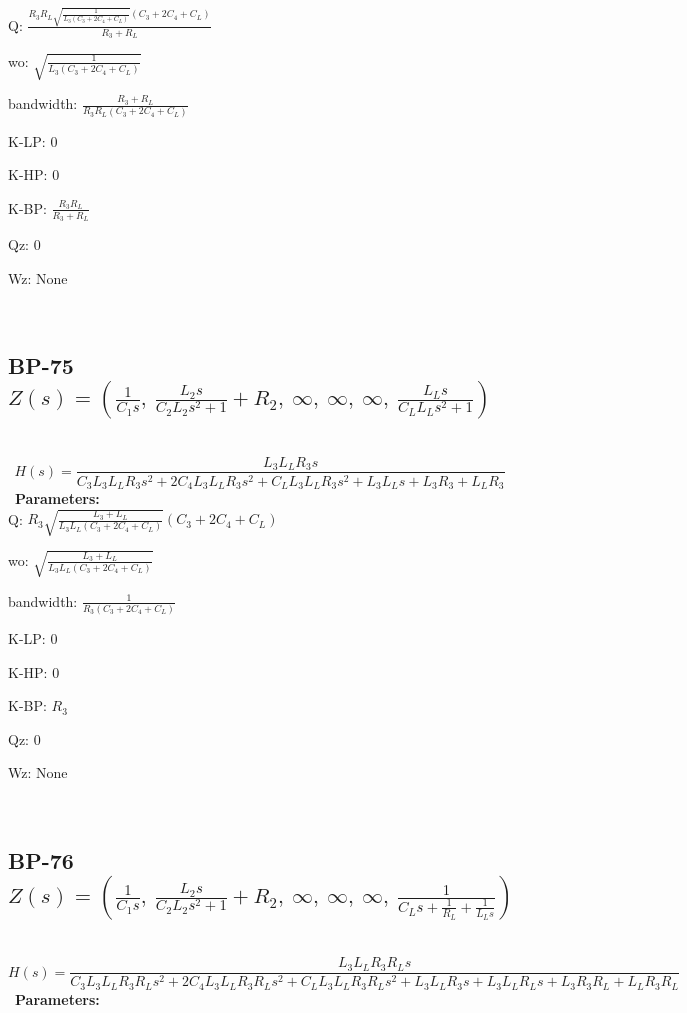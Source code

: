 \documentclass{article}
\begin{document}
Q: $\frac{R_{3} R_{L} \sqrt{\frac{1}{L_{3} \left(C_{3} + 2 C_{4} + C_{L}\right)}} \left(C_{3} + 2 C_{4} + C_{L}\right)}{R_{3} + R_{L}}$\ 

wo: $\sqrt{\frac{1}{L_{3} \left(C_{3} + 2 C_{4} + C_{L}\right)}}$\ 

bandwidth: $\frac{R_{3} + R_{L}}{R_{3} R_{L} \left(C_{3} + 2 C_{4} + C_{L}\right)}$\ 

K-LP: $0$\ 

K-HP: $0$\ 

K-BP: $\frac{R_{3} R_{L}}{R_{3} + R_{L}}$\ 

Qz: $0$\ 

Wz: $\text{None}$\ 

\ 

\subsection{BP-75 $Z(s) = \left( \frac{1}{C_{1} s}, \  \frac{L_{2} s}{C_{2} L_{2} s^{2} + 1} + R_{2}, \  \infty, \  \infty, \  \infty, \  \frac{L_{L} s}{C_{L} L_{L} s^{2} + 1}\right)$ } \ 
\textbf{\[H(s) = \frac{L_{3} L_{L} R_{3} s}{C_{3} L_{3} L_{L} R_{3} s^{2} + 2 C_{4} L_{3} L_{L} R_{3} s^{2} + C_{L} L_{3} L_{L} R_{3} s^{2} + L_{3} L_{L} s + L_{3} R_{3} + L_{L} R_{3}}\] } \ 
\textbf{Parameters:}\\ 

Q: $R_{3} \sqrt{\frac{L_{3} + L_{L}}{L_{3} L_{L} \left(C_{3} + 2 C_{4} + C_{L}\right)}} \left(C_{3} + 2 C_{4} + C_{L}\right)$\ 

wo: $\sqrt{\frac{L_{3} + L_{L}}{L_{3} L_{L} \left(C_{3} + 2 C_{4} + C_{L}\right)}}$\ 

bandwidth: $\frac{1}{R_{3} \left(C_{3} + 2 C_{4} + C_{L}\right)}$\ 

K-LP: $0$\ 

K-HP: $0$\ 

K-BP: $R_{3}$\ 

Qz: $0$\ 

Wz: $\text{None}$\ 

\ 

\subsection{BP-76 $Z(s) = \left( \frac{1}{C_{1} s}, \  \frac{L_{2} s}{C_{2} L_{2} s^{2} + 1} + R_{2}, \  \infty, \  \infty, \  \infty, \  \frac{1}{C_{L} s + \frac{1}{R_{L}} + \frac{1}{L_{L} s}}\right)$ } \ 
\textbf{\[H(s) = \frac{L_{3} L_{L} R_{3} R_{L} s}{C_{3} L_{3} L_{L} R_{3} R_{L} s^{2} + 2 C_{4} L_{3} L_{L} R_{3} R_{L} s^{2} + C_{L} L_{3} L_{L} R_{3} R_{L} s^{2} + L_{3} L_{L} R_{3} s + L_{3} L_{L} R_{L} s + L_{3} R_{3} R_{L} + L_{L} R_{3} R_{L}}\] } \ 
\textbf{Parameters:}\\ 
\end{document}
